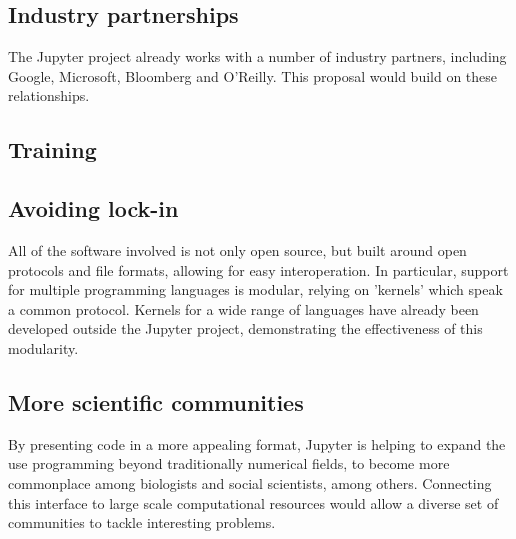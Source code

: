 \subsection{Industry partnerships}

The Jupyter project already works with a number of industry partners, including
Google, Microsoft, Bloomberg and O'Reilly. This proposal would build on these
relationships.


\subsection{Training}



\subsection{Avoiding lock-in}

All of the software involved is not only open source, but built around open
protocols and file formats, allowing for easy interoperation. In particular,
support for multiple programming languages is modular, relying on 'kernels'
which speak a common protocol. Kernels for a wide range of languages have
already been developed outside the Jupyter project, demonstrating the
effectiveness of this modularity.


\subsection{More scientific communities}

By presenting code in a more appealing format, Jupyter is helping to expand
the use programming beyond traditionally numerical fields, to become more
commonplace among biologists and social scientists, among others. Connecting
this interface to large scale computational resources would allow a diverse set
of communities to tackle interesting problems.


